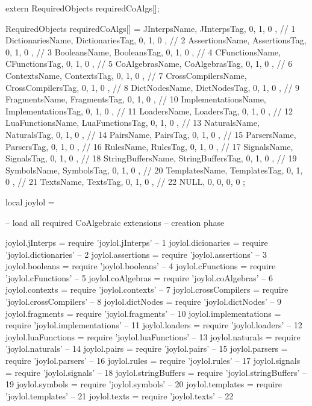 extern RequiredObjects requiredCoAlgs[];
\stopCHeader
{}

\startCCode
RequiredObjects requiredCoAlgs[] = {
  { JInterpsName,        JInterpsTag,        {0, 1, 0 }}, //  1
  { DictionariesName,    DictionariesTag,    {0, 1, 0 }}, //  2
  { AssertionsName,      AssertionsTag,      {0, 1, 0 }}, //  3
  { BooleansName,        BooleansTag,        {0, 1, 0 }}, //  4
  { CFunctionsName,      CFunctionsTag,      {0, 1, 0 }}, //  5
  { CoAlgebrasName,      CoAlgebrasTag,      {0, 1, 0 }}, //  6
  { ContextsName,        ContextsTag,        {0, 1, 0 }}, //  7
  { CrossCompilersName,  CrossCompilersTag,  {0, 1, 0 }}, //  8
  { DictNodesName,       DictNodesTag,       {0, 1, 0 }}, //  9
  { FragmentsName,       FragmentsTag,       {0, 1, 0 }}, // 10
  { ImplementationsName, ImplementationsTag, {0, 1, 0 }}, // 11
  { LoadersName,         LoadersTag,         {0, 1, 0 }}, // 12
  { LuaFunctionsName,    LuaFunctionsTag,    {0, 1, 0 }}, // 13
  { NaturalsName,        NaturalsTag,        {0, 1, 0 }}, // 14
  { PairsName,           PairsTag,           {0, 1, 0 }}, // 15
  { ParsersName,         ParsersTag,         {0, 1, 0 }}, // 16
  { RulesName,           RulesTag,           {0, 1, 0 }}, // 17
  { SignalsName,         SignalsTag,         {0, 1, 0 }}, // 18
  { StringBuffersName,   StringBuffersTag,   {0, 1, 0 }}, // 19
  { SymbolsName,         SymbolsTag,         {0, 1, 0 }}, // 20
  { TemplatesName,       TemplatesTag,       {0, 1, 0 }}, // 21
  { TextsName,           TextsTag,           {0, 1, 0 }}, // 22
  { NULL,                0,                  {0, 0, 0 }}
};
\stopCCode

\startLuaCode
local joylol = { }

-- load all required CoAlgebraic extensions -- creation phase

joylol.jInterps        = require 'joylol.jInterps'        --  1
joylol.dicionaries     = require 'joylol.dictionaries'    --  2
joylol.assertions      = require 'joylol.assertions'      --  3
joylol.booleans        = require 'joylol.booleans'        --  4
joylol.cFunctions      = require 'joylol.cFunctions'      --  5
joylol.coAlgebras      = require 'joylol.coAlgebras'      --  6
joylol.contexts        = require 'joylol.contexts'        --  7
joylol.crossCompilers  = require 'joylol.crossCompilers'  --  8
joylol.dictNodes       = require 'joylol.dictNodes'       --  9
joylol.fragments       = require 'joylol.fragments'       -- 10
joylol.implementations = require 'joylol.implementations' -- 11
joylol.loaders         = require 'joylol.loaders'         -- 12
joylol.luaFunctions    = require 'joylol.luaFunctions'    -- 13
joylol.naturals        = require 'joylol.naturals'        -- 14
joylol.pairs           = require 'joylol.pairs'           -- 15
joylol.parsers         = require 'joylol.parsers'         -- 16
joylol.rules           = require 'joylol.rules'           -- 17
joylol.signals         = require 'joylol.signals'         -- 18
joylol.stringBuffers   = require 'joylol.stringBuffers'   -- 19
joylol.symbols         = require 'joylol.symbols'         -- 20
joylol.templates       = require 'joylol.templates'       -- 21
joylol.texts           = require 'joylol.texts'           -- 22

